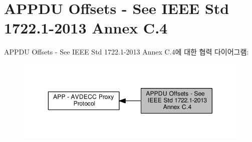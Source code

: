 \hypertarget{group__appdu__offset}{}\section{A\+P\+P\+DU Offsets -\/ See I\+E\+EE Std 1722.1-\/2013 Annex C.4}
\label{group__appdu__offset}
A\+P\+P\+DU Offsets -\/ See I\+E\+EE Std 1722.1-\/2013 Annex C.4에 대한 협력 다이어그램\+:
\nopagebreak
\begin{figure}[H]
\begin{center}
\leavevmode
\includegraphics[width=350pt]{group__appdu__offset}
\end{center}
\end{figure}

